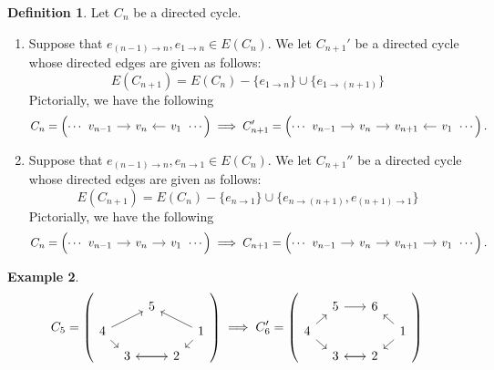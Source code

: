 \documentclass[11pt,reqno]{amsart}
\theoremstyle{definition}
\newtheorem{mydef}{Definition}[section]
\newtheorem{myeg}[mydef]{Example}
\theoremstyle{plain}
\begin{document}
\begin{mydef}
Let $C_n$ be a directed cycle. 
\begin{enumerate}
	\item 
Suppose that $e_{(n-1)\to n}, e_{1\to n} \in E(C_n)$. We let $C_{n+1}'$ be a directed cycle whose directed edges are given as follows:
\[
E(C_{n+1}) = E(C_n) - \{e_{1\to n}\} \cup \{e_{1\to (n+1)}\}
\]
Pictorially, we have the following
\[
	C_n= \left( \cdots \begin{tikzcd}[column sep=0.4cm]
		v_{n-1} \arrow[r] & v_n & v_1 \arrow[l] 
	\end{tikzcd} \cdots \right)
	\implies
	C_{n+1}'= \left( \cdots \begin{tikzcd}[column sep=0.4cm]
		v_{n-1} \arrow[r] & v_n \arrow[r] & v_{n+1} &  v_1 \arrow[l] 
	\end{tikzcd} \cdots \right).
\]
\item 
Suppose that $e_{(n-1)\to n}, e_{n\to 1} \in E(C_n)$. We let $C_{n+1}''$ be a directed cycle whose directed edges are given as follows:
\[
E(C_{n+1}) = E(C_n) - \{e_{n\to 1}\} \cup \{e_{n\to (n+1)}, e_{(n+1)\to 1} \}
\]
Pictorially, we have the following
\[
C_n=\left( \cdots \begin{tikzcd}[column sep=0.4cm]
	v_{n-1} \arrow[r] & v_n \arrow[r] & v_1 
\end{tikzcd} \cdots \right)
\implies
C_{n+1}= \left( \cdots \begin{tikzcd}[column sep=0.4cm]
	v_{n-1} \arrow[r] & v_n \arrow[r] & v_{n+1} \arrow[r] & v_1 
\end{tikzcd} \cdots \right).
\]
\end{enumerate}
\end{mydef}

\begin{myeg}
\[
C_5=\left( \begin{tikzcd}[row sep=0.2cm, column sep=0.2cm]
	& & 5  & &  \\ 
	4 \arrow[urr] \arrow[dr] & & & & 1 \arrow[dl]\arrow[ull] \\ 
	& 3 \arrow[rr] & & 2 \arrow[ll]& 
\end{tikzcd}\right)	
\implies C_6'= \left( \begin{tikzcd}[row sep=0.2cm, column sep=0.3cm]
	& 5 \arrow[rr]&  &6 &  \\ 
	4  \arrow[dr] \arrow[ur] & & & & 1 \arrow[dl] \arrow[ul] \\ 
	& 3 \arrow[rr] & & 2 \arrow[ll]& 
\end{tikzcd}\right)	
\] 
\end{myeg}
\end{document}
